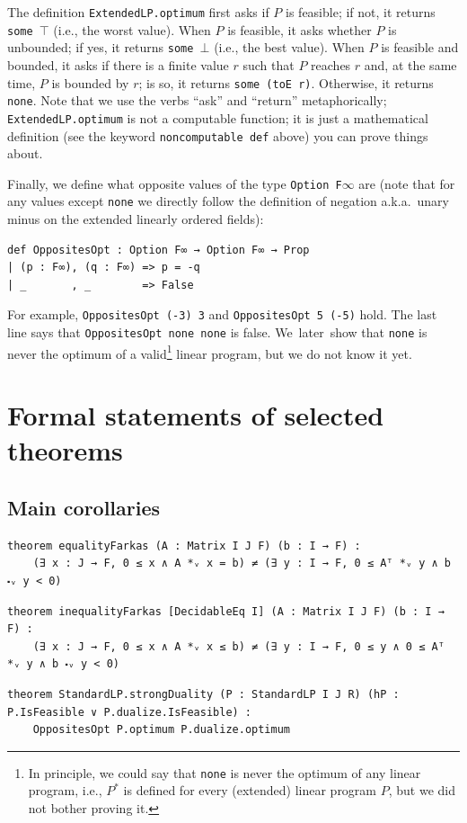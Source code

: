\documentclass[]{article}
\renewcommand{\.}{\hskip .75pt}
\begin{document}
The definition \texttt{ExtendedLP.optimum} first asks if $P$ is feasible;
if not, it returns \texttt{some $\top$} (i.e., the worst value).
When $P$ is feasible, it asks whether $P$ is unbounded; if yes, it returns \texttt{some $\bot$}
(i.e., the best value).
When $P$ is feasible and bounded,
it asks if there is a finite value $r$ such that $P$ reaches $r$ and, at the same time,
$P$ is bounded by $r$; is so, it returns \texttt{some (toE r)}.
Otherwise, it returns \texttt{none}.
Note that we use the verbs ``ask'' and ``return'' metaphorically;
\texttt{ExtendedLP.optimum} is not a computable function; it is just a mathematical
definition (see the keyword \texttt{noncomputable def} above) you can prove things about.
\pagebreak[2]

Finally, we define what opposite values of the type \texttt{Option F$\infty$} are
(note that for any values except \texttt{none} we directly follow the definition
of negation a.k.a.\ unary minus on the extended linearly ordered fields):
\begin{lstlisting}
def OppositesOpt : Option F∞ → Option F∞ → Prop
| (p : F∞), (q : F∞) => p = -q
| _       , _        => False
\end{lstlisting}
For example, \texttt{OppositesOpt (-3) 3} and \texttt{OppositesOpt 5 (-5)} hold.
The last line says that \texttt{OppositesOpt none none} is false.
We~later~show that \texttt{none} is never the optimum of a valid\footnote{
In principle, we could say that \texttt{none} is never the optimum of any
linear program, i.e., $P^\ast$ is defined for every (extended) linear program $P$,
but we did not bother proving it.} linear program, but we do not know it yet.


\section{Formal statements of selected theorems}
\label{statements}

\subsection{Main corollaries}

\begin{lstlisting}
theorem equalityFarkas (A : Matrix I J F) (b : I → F) :
    (∃ x : J → F, 0 ≤ x ∧ A *ᵥ x = b) ≠ (∃ y : I → F, 0 ≤ Aᵀ *ᵥ y ∧ b ⬝ᵥ y < 0)
\end{lstlisting}
\begin{lstlisting}
theorem inequalityFarkas [DecidableEq I] (A : Matrix I J F) (b : I → F) :
    (∃ x : J → F, 0 ≤ x ∧ A *ᵥ x ≤ b) ≠ (∃ y : I → F, 0 ≤ y ∧ 0 ≤ Aᵀ *ᵥ y ∧ b ⬝ᵥ y < 0)
\end{lstlisting}
\begin{lstlisting}
theorem StandardLP.strongDuality (P : StandardLP I J R) (hP : P.IsFeasible ∨ P.dualize.IsFeasible) :
    OppositesOpt P.optimum P.dualize.optimum
\end{lstlisting}
\end{document}

